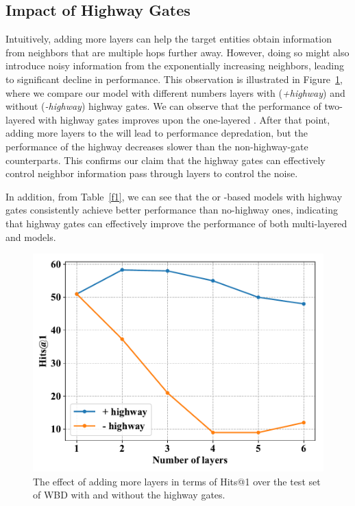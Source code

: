 \subsection{Impact of Highway Gates} Intuitively, adding more \HRGCN layers can help the target entities obtain information from neighbors that are multiple hops
further away. However, doing so might also introduce noisy information from the exponentially increasing neighbors, leading to significant
decline in performance. This observation is illustrated in Figure~\ref{highway}, where we compare our model with different numbers layers
with (\emph{+highway}) and without (\emph{-highway}) highway gates. We can observe that the performance of two-layered \RGCNs with highway
gates improves upon the one-layered \RGCN. After that point, adding more layers to the \RGCN will lead to performance depredation, but the
performance of the highway \RGCNs decreases slower than the non-highway-gate counterparts. This confirms our claim that the highway gates
can effectively control neighbor information pass through \RGCN layers to control the noise. 

In addition, from Table~\ref{f1}, we can see that the \GCN or \RGCN-based models with highway gates consistently achieve better performance than no-highway ones, indicating that highway gates can effectively improve the performance of both multi-layered \GCN and \RGCN models.
\begin{figure}
	\centering
	\includegraphics[width=0.9\linewidth]{figures/graph3.pdf}
	\caption{The effect of adding more \RGCN layers in terms of Hits@1 over the test set of WBD with and without the highway gates.}
	\label{highway}
\end{figure}
